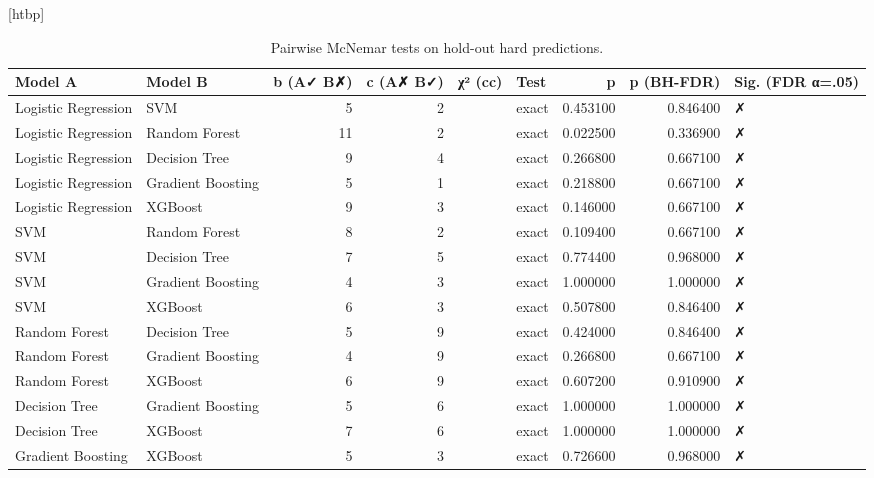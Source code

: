 \begin{table}
\small[htbp]
\caption{Pairwise McNemar tests on hold-out hard predictions.}
\label{tab:A01_mcnemar}
\begin{tabular}{llrrllrrl}
\toprule
Model A & Model B & b (A✓ B✗) & c (A✗ B✓) & χ² (cc) & Test & p & p (BH-FDR) & Sig. (FDR α=.05) \\
\midrule
Logistic Regression & SVM & 5 & 2 &  & exact & 0.453100 & 0.846400 & ✗ \\
Logistic Regression & Random Forest & 11 & 2 &  & exact & 0.022500 & 0.336900 & ✗ \\
Logistic Regression & Decision Tree & 9 & 4 &  & exact & 0.266800 & 0.667100 & ✗ \\
Logistic Regression & Gradient Boosting & 5 & 1 &  & exact & 0.218800 & 0.667100 & ✗ \\
Logistic Regression & XGBoost & 9 & 3 &  & exact & 0.146000 & 0.667100 & ✗ \\
SVM & Random Forest & 8 & 2 &  & exact & 0.109400 & 0.667100 & ✗ \\
SVM & Decision Tree & 7 & 5 &  & exact & 0.774400 & 0.968000 & ✗ \\
SVM & Gradient Boosting & 4 & 3 &  & exact & 1.000000 & 1.000000 & ✗ \\
SVM & XGBoost & 6 & 3 &  & exact & 0.507800 & 0.846400 & ✗ \\
Random Forest & Decision Tree & 5 & 9 &  & exact & 0.424000 & 0.846400 & ✗ \\
Random Forest & Gradient Boosting & 4 & 9 &  & exact & 0.266800 & 0.667100 & ✗ \\
Random Forest & XGBoost & 6 & 9 &  & exact & 0.607200 & 0.910900 & ✗ \\
Decision Tree & Gradient Boosting & 5 & 6 &  & exact & 1.000000 & 1.000000 & ✗ \\
Decision Tree & XGBoost & 7 & 6 &  & exact & 1.000000 & 1.000000 & ✗ \\
Gradient Boosting & XGBoost & 5 & 3 &  & exact & 0.726600 & 0.968000 & ✗ \\
\bottomrule
\end{tabular}
\end{table}
